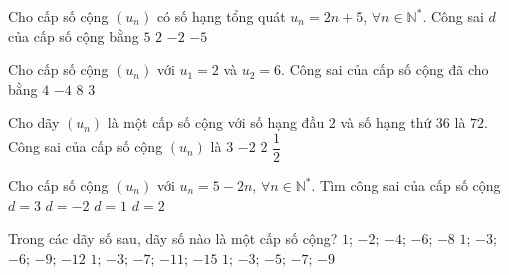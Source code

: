 \begin{ex}%
	Cho cấp số cộng $\left(u_n\right)$ có số  hạng tổng quát $u_n=2n+5$, $\forall n \in \mathbb{N}^*$. Công sai $d$ của cấp số cộng bằng
	\choice 
		{$5$} 
		 {\True $2$}
		 {$-2$}
		{$-5$} 
\end{ex}

\begin{ex}%
	Cho cấp số cộng  $\left(u_n\right)$ với $u_1=2$ và $u_2=6$. Công sai của cấp số cộng đã cho bằng
	\choice 
		{\True  $4$}
		 {$-4$}
		 {$8$}
		{$3$} 
\end{ex}

\begin{ex}%
	Cho dãy $(u_n)$ là một cấp số cộng với số hạng đầu $2$ và số hạng thứ $36$  là $72$. Công sai của cấp số cộng $(u_n)$ là
	 \choice
		 {$3$}
		 {$-2$}
		 {\True $2$}
		{$\dfrac{1}{2}$} 
\end{ex}

\begin{ex}%
	Cho cấp số cộng $\left(u_n\right)$ với $u_n=5-2n$, $\forall n \in \mathbb{N}^*$. Tìm công sai của  cấp số cộng
	 \choice
		 {$d=3$}
		{\True  $d=-2$}
		{$d=1$} 
		 {$d=2$}
\end{ex}

\begin{ex}%
	Trong các dãy số sau, dãy số nào là một cấp  số cộng?
	\choice 
		{$1$; $-2$; $-4$; $-6$; $-8$} 
		{$1$; $-3$; $-6$; $-9$;  $-12$}
		{\True  $1$; $-3$; $-7$; $-11$; $-15$}
		{$1$; $-3$; $-5$;  $-7$; $-9$}
\end{ex}

